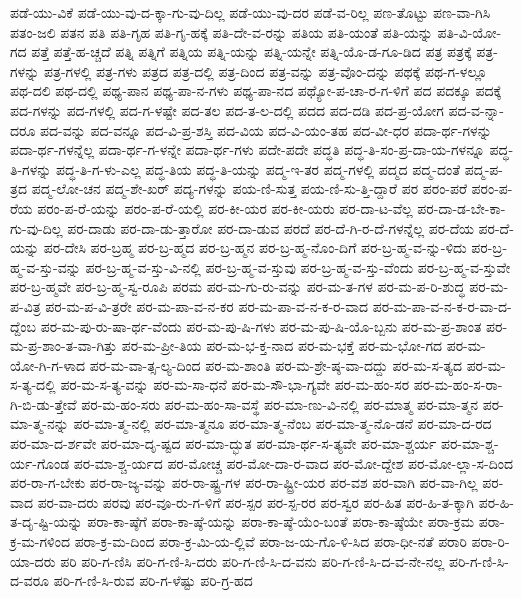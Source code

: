 {ಪಡೆ-ಯು-ವಿಕೆ
ಪಡೆ-ಯು-ವು-ದ-ಕ್ಕಾ-ಗು-ವು-ದಿಲ್ಲ
ಪಡೆ-ಯು-ವು-ದರ
ಪಡೆ-ವ-ರಿಲ್ಲ
ಪಣ-ತೊಟ್ಟು
ಪಣ-ವಾ-ಗಿಸಿ
ಪತಂ-ಜಲಿ
ಪತನ
ಪತಿ
ಪತಿ-ಗೃಹ
ಪತಿ-ಗೃ-ಹಕ್ಕೆ
ಪತಿ-ದೇ-ವ-ರನ್ನು
ಪತಿಯ
ಪತಿ-ಯಂತೆ
ಪತಿ-ಯನ್ನು
ಪತಿ-ವಿ-ಯೋ-ಗದ
ಪತ್ತೆ
ಪತ್ತೆ-ಹ-ಚ್ಚದೆ
ಪತ್ನಿ
ಪತ್ನಿಗೆ
ಪತ್ನಿಯ
ಪತ್ನಿ-ಯನ್ನು
ಪತ್ನಿ-ಯನ್ನೇ
ಪತ್ನಿ-ಯೊ-ಡ-ಗೂ-ಡಿದ
ಪತ್ರ
ಪತ್ರಕ್ಕೆ
ಪತ್ರ-ಗಳನ್ನು
ಪತ್ರ-ಗಳಲ್ಲಿ
ಪತ್ರ-ಗಳು
ಪತ್ರದ
ಪತ್ರ-ದಲ್ಲಿ
ಪತ್ರ-ದಿಂದ
ಪತ್ರ-ವನ್ನು
ಪತ್ರ-ವೊಂ-ದನ್ನು
ಪಥಕ್ಕೆ
ಪಥ-ಗ-ಳಲ್ಲೂ
ಪಥ-ದಲಿ
ಪಥ-ದಲ್ಲಿ
ಪಥ್ಯ-ಪಾನ
ಪಥ್ಯ-ಪಾ-ನ-ಗಳು
ಪಥ್ಯ-ಪಾ-ನದ
ಪಥ್ಯೋ-ಪ-ಚಾ-ರ-ಗ-ಳಿಗೆ
ಪದ
ಪದಕ್ಕೂ
ಪದಕ್ಕೆ
ಪದ-ಗಳನ್ನು
ಪದ-ಗಳಲ್ಲಿ
ಪದ-ಗ-ಳಷ್ಟೇ
ಪದ-ತಲ
ಪದ-ತ-ಲ-ದಲ್ಲಿ
ಪದದ
ಪದ-ದಡಿ
ಪದ-ಪ್ರ-ಯೋಗ
ಪದ-ವ-ನ್ನಾ-ದರೂ
ಪದ-ವನ್ನು
ಪದ-ವನ್ನೂ
ಪದ-ವಿ-ಪ್ರ-ಶಸ್ತಿ
ಪದ-ವಿಯ
ಪದ-ವಿ-ಯಂ-ತಹ
ಪದ-ವೀ-ಧರ
ಪದಾ-ರ್ಥ-ಗಳನ್ನು
ಪದಾ-ರ್ಥ-ಗಳನ್ನೆಲ್ಲ
ಪದಾ-ರ್ಥ-ಗ-ಳನ್ನೇ
ಪದಾ-ರ್ಥ-ಗಳು
ಪದೇ-ಪದೇ
ಪದ್ಧತಿ
ಪದ್ಧ-ತಿ-ಸಂ-ಪ್ರ-ದಾ-ಯ-ಗಳನ್ನೂ
ಪದ್ಧ-ತಿ-ಗಳನ್ನು
ಪದ್ಧ-ತಿ-ಗ-ಳು-ಎಲ್ಲ
ಪದ್ಧ-ತಿಯ
ಪದ್ಧ-ತಿ-ಯನ್ನು
ಪದ್ಮ-ಇ-ತರ
ಪದ್ಮ-ಗಳಲ್ಲಿ
ಪದ್ಮದ
ಪದ್ಮ-ದಂತೆ
ಪದ್ಮ-ಪ-ತ್ರದ
ಪದ್ಮ-ಲೋ-ಚನ
ಪದ್ಮ-ಶೇ-ಖರ್
ಪದ್ಯ-ಗಳನ್ನು
ಪಯ-ಣಿ-ಸುತ್ತ
ಪಯ-ಣಿ-ಸು-ತ್ತಿ-ದ್ದಾರೆ
ಪರ
ಪರಂ-ಪರೆ
ಪರಂ-ಪ-ರೆಯ
ಪರಂ-ಪ-ರೆ-ಯನ್ನು
ಪರಂ-ಪ-ರೆ-ಯಲ್ಲಿ
ಪರ-ಕೀ-ಯರ
ಪರ-ಕೀ-ಯರು
ಪರ-ದಾ-ಟ-ವೆಲ್ಲ
ಪರ-ದಾ-ಡ-ಬೇ-ಕಾ-ಗು-ವು-ದಿಲ್ಲ
ಪರ-ದಾಡು
ಪರ-ದಾ-ಡು-ತ್ತಾರೋ
ಪರ-ದಾ-ಡುವ
ಪರದೆ
ಪರ-ದೆ-ಗಿ-ರ-ದೆ-ಗಳನ್ನೆಲ್ಲ
ಪರ-ದೆಯ
ಪರ-ದೆ-ಯನ್ನು
ಪರ-ದೇಸಿ
ಪರ-ಬ್ರಹ್ಮ
ಪರ-ಬ್ರ-ಹ್ಮದ
ಪರ-ಬ್ರ-ಹ್ಮನ
ಪರ-ಬ್ರ-ಹ್ಮ-ನೊಂ-ದಿಗೆ
ಪರ-ಬ್ರ-ಹ್ಮ-ವ-ನ್ನು-ಳಿದು
ಪರ-ಬ್ರ-ಹ್ಮ-ವ-ಸ್ತು-ವನ್ನು
ಪರ-ಬ್ರ-ಹ್ಮ-ವ-ಸ್ತು-ವಿ-ನಲ್ಲಿ
ಪರ-ಬ್ರ-ಹ್ಮ-ವ-ಸ್ತುವು
ಪರ-ಬ್ರ-ಹ್ಮ-ವ-ಸ್ತು-ವೆಂದು
ಪರ-ಬ್ರ-ಹ್ಮ-ವ-ಸ್ತುವೇ
ಪರ-ಬ್ರ-ಹ್ಮವೇ
ಪರ-ಬ್ರ-ಹ್ಮ-ಸ್ವ-ರೂಪಿ
ಪರಮ
ಪರ-ಮ-ಗು-ರು-ವನ್ನು
ಪರ-ಮ-ತ-ಗಳ
ಪರ-ಮ-ಪ-ರಿ-ಶುದ್ಧ
ಪರ-ಮ-ಪ-ವಿತ್ರ
ಪರ-ಮ-ಪ-ವಿ-ತ್ರರೇ
ಪರ-ಮ-ಪಾ-ವ-ನ-ಕರ
ಪರ-ಮ-ಪಾ-ವ-ನ-ಕ-ರ-ವಾದ
ಪರ-ಮ-ಪಾ-ವ-ನ-ಕ-ರ-ವಾ-ದ-ದ್ದೆಂಬ
ಪರ-ಮ-ಪು-ರು-ಷಾ-ರ್ಥ-ವೆಂದು
ಪರ-ಮ-ಪು-ಷಿ-ಗಳು
ಪರ-ಮ-ಪು-ಷಿ-ಯೊ-ಬ್ಬನು
ಪರ-ಮ-ಪ್ರ-ಶಾಂತ
ಪರ-ಮ-ಪ್ರ-ಶಾಂ-ತ-ವಾ-ಗಿತ್ತು
ಪರ-ಮ-ಪ್ರೀ-ತಿಯ
ಪರ-ಮ-ಭ-ಕ್ತ-ನಾದ
ಪರ-ಮ-ಭಕ್ತೆ
ಪರ-ಮ-ಭೋ-ಗದ
ಪರ-ಮ-ಯೋ-ಗಿ-ಗ-ಳಾದ
ಪರ-ಮ-ವಾ-ತ್ಸ-ಲ್ಯ-ದಿಂದ
ಪರ-ಮ-ಶಾಂತಿ
ಪರ-ಮ-ಶ್ರೇ-ಷ್ಠ-ವಾ-ದದ್ದು
ಪರ-ಮ-ಸ-ತ್ಯದ
ಪರ-ಮ-ಸ-ತ್ಯ-ದಲ್ಲಿ
ಪರ-ಮ-ಸ-ತ್ಯ-ವನ್ನು
ಪರ-ಮ-ಸಾ-ಧನೆ
ಪರ-ಮ-ಸೌ-ಭಾ-ಗ್ಯವೇ
ಪರ-ಮ-ಹಂ-ಸರ
ಪರ-ಮ-ಹಂ-ಸ-ರಾ-ಗಿ-ಬಿ-ಡು-ತ್ತೇವೆ
ಪರ-ಮ-ಹಂ-ಸರು
ಪರ-ಮ-ಹಂ-ಸಾ-ವಸ್ಥೆ
ಪರ-ಮಾ-ಣು-ವಿ-ನಲ್ಲಿ
ಪರ-ಮಾತ್ಮ
ಪರ-ಮಾ-ತ್ಮನ
ಪರ-ಮಾ-ತ್ಮ-ನನ್ನು
ಪರ-ಮಾ-ತ್ಮ-ನಲ್ಲಿ
ಪರ-ಮಾ-ತ್ಮನೂ
ಪರ-ಮಾ-ತ್ಮ-ನೆಂಬ
ಪರ-ಮಾ-ತ್ಮ-ನೊ-ಡನೆ
ಪರ-ಮಾ-ದ-ರದ
ಪರ-ಮಾ-ದ-ರ್ಶವೇ
ಪರ-ಮಾ-ದೃ-ಷ್ಟದ
ಪರ-ಮಾ-ದ್ಭುತ
ಪರ-ಮಾ-ರ್ಥ-ಸ-ತ್ಯವೇ
ಪರ-ಮಾ-ಶ್ಚರ್ಯ
ಪರ-ಮಾ-ಶ್ಚ-ರ್ಯ-ಗೊಂಡ
ಪರ-ಮಾ-ಶ್ಚ-ರ್ಯದ
ಪರ-ಮೋಚ್ಚ
ಪರ-ಮೋ-ದಾ-ರ-ವಾದ
ಪರ-ಮೋ-ದ್ದೇಶ
ಪರ-ಮೋ-ಲ್ಲಾ-ಸ-ದಿಂದ
ಪರ-ರಾ-ಗ-ಬೇಕು
ಪರ-ರಾ-ಜ್ಯ-ವನ್ನು
ಪರ-ರಾ-ಷ್ಟ್ರ-ಗಳ
ಪರ-ರಾ-ಷ್ಟ್ರೀ-ಯರ
ಪರ-ವಶ
ಪರ-ವಾಗಿ
ಪರ-ವಾ-ಗಿಲ್ಲ
ಪರ-ವಾದ
ಪರ-ವಾ-ದರು
ಪರವು
ಪರ-ವೂ-ರು-ಗ-ಳಿಗೆ
ಪರ-ಸ್ಪರ
ಪರ-ಸ್ಪ-ರರ
ಪರ-ಸ್ವರ
ಪರ-ಹಿತ
ಪರ-ಹಿ-ತ-ಕ್ಕಾಗಿ
ಪರ-ಹಿ-ತ-ದೃ-ಷ್ಟಿ-ಯನ್ನು
ಪರಾ-ಕಾ-ಷ್ಠೆಗೆ
ಪರಾ-ಕಾ-ಷ್ಠೆ-ಯನ್ನು
ಪರಾ-ಕಾ-ಷ್ಠೆ-ಯೆಂ-ಬಂತೆ
ಪರಾ-ಕಾ-ಷ್ಠೆಯೇ
ಪರಾ-ಕ್ರಮ
ಪರಾ-ಕ್ರ-ಮ-ಗಳಿಂದ
ಪರಾ-ಕ್ರ-ಮ-ದಿಂದ
ಪರಾ-ಕ್ರ-ಮಿ-ಯ-ಲ್ಲಿವೆ
ಪರಾ-ಜ-ಯ-ಗೊ-ಳಿ-ಸಿದ
ಪರಾ-ಧೀ-ನತೆ
ಪರಾರಿ
ಪರಾ-ರಿ-ಯಾ-ದರು
ಪರಿ
ಪರಿ-ಗ-ಣಿಸಿ
ಪರಿ-ಗ-ಣಿ-ಸಿ-ದರು
ಪರಿ-ಗ-ಣಿ-ಸಿ-ದ-ವನು
ಪರಿ-ಗ-ಣಿ-ಸಿ-ದ-ವ-ನೇ-ನಲ್ಲ
ಪರಿ-ಗ-ಣಿ-ಸಿ-ದ-ವರೂ
ಪರಿ-ಗ-ಣಿ-ಸಿ-ರುವ
ಪರಿ-ಗ-ಳೆಷ್ಟು
ಪರಿ-ಗ್ರ-ಹದ
}
